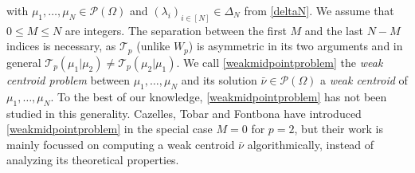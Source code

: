 \documentclass[letterpaper]{amsart}
\theoremstyle{definition}
\begin{document}
with $\mu_1,\dots,\mu_N\in\mathcal P(\Omega)$ and $(\lambda_i)_{i\in[N]}\in\Delta_N$ from \eqref{deltaN}. We assume that $0\leq M\leq N$ are integers. The separation between the first $M$ and the last $N-M$ indices is necessary, as $\mathcal T_p$ (unlike $W_p$) is asymmetric in its two arguments and in general $\mathcal T_p(\mu_1|\mu_2)\neq\mathcal T_p(\mu_2|\mu_1)$. We call \eqref{weakmidpointproblem} the \textit{weak centroid problem} between $\mu_1,\dots,\mu_N$ and its solution $\bar\nu\in\mathcal P(\Omega)$ a \textit{weak centroid} of $\mu_1,\dots,\mu_N$. To the best of our knowledge, \eqref{weakmidpointproblem} has not been studied in this generality. Cazelles, Tobar and Fontbona \cite{cazelles2021} have introduced \eqref{weakmidpointproblem} in the special case $M=0$ for $p=2$, but their work is mainly focussed on computing a weak centroid $\bar\nu$ algorithmically, instead of analyzing its theoretical properties.
\end{document}
